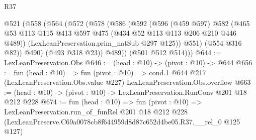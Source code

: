 \begin{lexlean}{R37}
\begin{coremodule}
      @521
        (@558
          (@564
            (@572
              (@578
                (@586
                  (@592
                    (@596
                      (@459 @597)
                      @582
                      (@465 @53 @113 @115 @413 @597 @475 (@434 @52 @113 @113 @206 @210 @446 @489))
                      (LexLeanPreservation.prim_natSub @297 @125))
                    @551)
                  (@554 @316 @82))
                @490)
              (@493 @318 @23))
            @489))
        (@501 @512 @514)))
@644 := LexLeanPreservation.Obs
@646 := (head : @10) -> (pivot : @10) -> @644
@656 := fun (head : @10) =>
  fun (pivot : @10) =>
  cond.{1} @644 @217 (LexLeanPreservation.Obs.value @227) LexLeanPreservation.Obs.overflow
@663 := (head : @10) -> (pivot : @10) -> LexLeanPreservation.RunConv @201 @18 @212 @228
@674 := fun (head : @10) =>
  fun (pivot : @10) =>
  LexLeanPreservation.run_of_funRel
    @201
    @18
    @212
    @228
    (LexLeanPreserve.C69a0078cb8f644959d8d87c652d4be05.R37.__rel_0 @125 @127)
\end{coremodule}
\end{lexlean}
